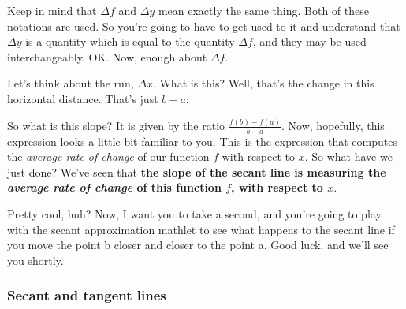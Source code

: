 \documentclass[pdftex, brazil, 12pt, twoside]{article}
\begin{document}
Keep in mind that $\Delta f$ and $\Delta y$
mean exactly the same thing.
Both of these notations are used.
So you're going to have to get used to it
and understand that $\Delta y$ is a quantity which
is equal to the quantity $\Delta f$,
and they may be used interchangeably.
OK.
Now, enough about $\Delta f$.

Let's think about the run, $\Delta x$.
What is this?
Well, that's the change in this horizontal distance.
That's just $b -a$:

\begin{figure}[H]
  \begin{center}
  \end{center}
\end{figure}

So what is this slope?
It is given by the ratio $\displaystyle \frac{f(b) - f(a)}{b-a}$.
Now, hopefully, this expression looks
a little bit familiar to you.
This is the expression that computes
the \emph{average rate of change} of our function
$f$ with respect to $x$.
So what have we just done?
We've seen that \textbf{the slope of the secant line
  is measuring the \emph{average rate of change} of this function $f$, with respect to $x$}.

Pretty cool, huh?
Now, I want you to take a second,
and you're going to play with the secant approximation
mathlet to see what happens to the secant line
if you move the point b closer and closer to the point a.
Good luck, and we'll see you shortly.

\subsubsection{Secant and tangent lines}
\label{u1-geometric-secant-tangent}
\end{document}
